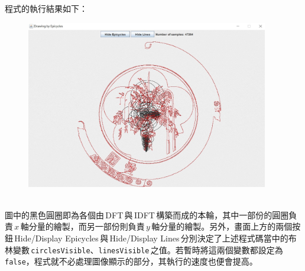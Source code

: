   程式的執行結果如下：
  \begin{figure}[h!]
    \centering
    \includegraphics[width=300pt]{NTU drawing.jpg}
  \end{figure}
  \noindent \\
  圖中的黑色圓圈即為各個由\,DFT\,與\,IDFT\,構築而成的本輪，其中一部份的圓圈負責\,\(x\)\,軸分量的繪製，而另一部份則負責\,\(y\)\,軸分量的繪製。另外，畫面上方的兩個按鈕\,Hide/Display Epicycles\,與\,Hide/Display Lines\,分別決定了上述程式碼當中的布林變數\,\texttt{circlesVisible}、\texttt{linesVisible}\,之值。若暫時將這兩個變數都設定為\,\texttt{false}，程式就不必處理圖像顯示的部分，其執行的速度也便會提高。
  